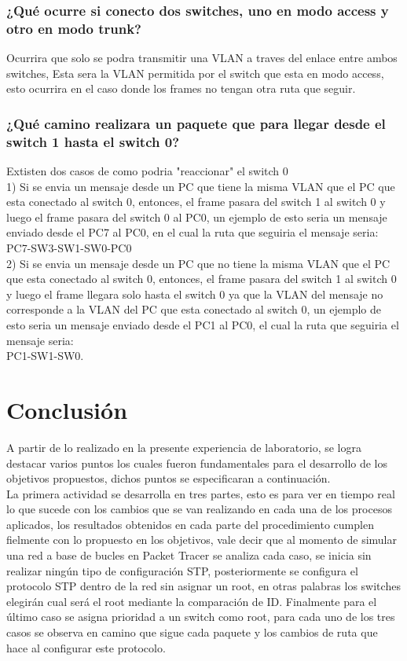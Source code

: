 \documentclass[spanish]{udpreport}
\begin{document}
\subsection{¿Qué ocurre si conecto dos switches, uno en modo access y otro en modo trunk?}
Ocurrira que solo se podra transmitir una VLAN a traves del enlace entre ambos switches, Esta  sera la VLAN permitida por el switch que esta en modo access, esto ocurrira en el caso donde los frames no tengan otra ruta que seguir.\\

\subsection{¿Qué camino realizara un paquete que para llegar desde el switch 1 hasta el switch 0?}
Extisten dos casos de como podria "reaccionar" el switch 0\\
1) Si se envia un mensaje desde un PC que tiene la misma VLAN que el PC que esta conectado al switch 0, entonces, el frame pasara del switch 1 al switch 0 y luego el frame pasara del switch 0 al PC0, un ejemplo de esto seria un mensaje enviado desde el PC7 al PC0, en el cual la ruta que seguiria el mensaje seria:\\PC7-SW3-SW1-SW0-PC0\\

2) Si se envia un mensaje desde un PC que no tiene la misma VLAN que el PC que esta conectado al switch 0, entonces, el frame pasara del switch 1 al switch 0 y luego el frame llegara solo hasta el switch 0 ya que la VLAN del mensaje no corresponde a la VLAN del PC que esta conectado al switch 0, un ejemplo de esto seria un mensaje enviado desde el PC1 al PC0, el cual la ruta que seguiria el mensaje seria:\\PC1-SW1-SW0.
\chapter{Conclusión}

A partir de lo realizado en la presente experiencia de laboratorio, se logra destacar varios puntos los cuales fueron fundamentales para el desarrollo de los objetivos propuestos, dichos puntos se especificaran a continuación.\\

La primera actividad se desarrolla en tres partes, esto es para ver en tiempo real lo que sucede con los cambios que se van realizando  en cada una de los procesos aplicados, los resultados obtenidos en cada parte del procedimiento cumplen fielmente con lo propuesto en los objetivos, vale decir que al momento de simular una red a base de bucles en Packet Tracer se analiza cada caso, se inicia sin realizar ningún tipo de configuración STP, posteriormente se configura el protocolo STP dentro de la red sin asignar un root, en otras palabras los switches elegirán cual será el root mediante la comparación de ID. Finalmente para el último caso se asigna prioridad a un switch como root, para cada uno de los tres casos se observa en camino que sigue cada paquete y los cambios de ruta que hace al configurar este protocolo.\\
\end{document}
